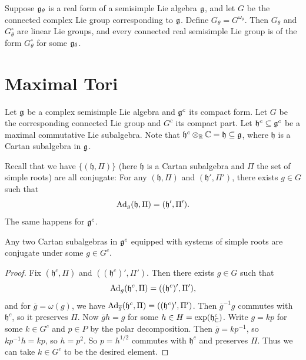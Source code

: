 \begin{prop}
  Suppose $\mathfrak{g}_\theta$ is a real form of a
  semisimple Lie algebra $\mathfrak{g}$, and let
  $G$ be the connected complex Lie group
  corresponding to $\mathfrak{g}$. Define
  $G_\theta = G^{\omega_\theta}$.
  Then $G_\theta$ and $G^\circ_\theta$ are
  linear Lie groups, and every connected
  real semisimple Lie group is of the form
  $G_\theta^\circ$ for some $\mathfrak{g}_\theta$.
\end{prop}

\section{Maximal Tori}

\begin{remark}
  Let $\mathfrak{g}$ be a complex semisimple Lie
  algebra and $\mathfrak{g}^c$ its compact form.
  Let $G$ be the corresponding connected
  Lie group and $G^c$ its compact part.
  Let $\mathfrak{h}^c \subseteq \mathfrak{g}^c$
  be a maximal commutative Lie subalgebra.
  Note that $\mathfrak{h}^c \otimes_{\mathbb{R}} \mathbb{C} = \mathfrak{h} \subseteq \mathfrak{g}$,
  where $\mathfrak{h}$ is
  a Cartan subalgebra in $\mathfrak{g}$.
\end{remark}

\begin{remark}
  Recall that we have
  $\{(\mathfrak{h}, \Pi)\}$ (here
  $\mathfrak{h}$ is a Cartan subalgebra
  and $\Pi$ the set of simple roots) are all
  conjugate: For any $(\mathfrak{h}, \Pi)$
  and $(\mathfrak{h}', \Pi')$, there
  exists $g \in G$ such that
  \[
    \operatorname{Ad}_g(\mathfrak{h}, \Pi) = (\mathfrak{h}', \Pi').
  \]
  The same happens for $\mathfrak{g}^c$.
\end{remark}

\begin{lemma}
  Any two Cartan subalgebras in $\mathfrak{g}^c$
  equipped with systems of simple roots
  are conjugate under some $g \in G^c$.
\end{lemma}

\begin{proof}
  Fix $(\mathfrak{h}^c, \Pi)$ and
  $((\mathfrak{h}^c)', \Pi')$. Then there
  exists $g \in G$ such that
  \[
    \operatorname{Ad}_g(\mathfrak{h}^c, \Pi) = ((\mathfrak{h}^c)', \Pi'),
  \]
  and for $\overline{g} = \omega(g)$,
  we have $\operatorname{Ad}_{\overline{g}}(\mathfrak{h}^c, \Pi) = ((\mathfrak{h}^c)', \Pi')$.
  Then $\overline{g}^{-1} g$ commutes
  with $\mathfrak{h}^c$,
  so it preserves $\Pi$. Now
  $\overline{g} h = g$ for some
  $h \in H = \exp(\mathfrak{h}^c_{\mathbb{C}})$.
  Write $g = kp$ for some $k \in G^c$ and
  $p \in P$ by the polar decomposition. Then
  $\overline{g} = kp^{-1}$, so
  $kp^{-1} h = kp$, so $h = p^2$.
  So $p = h^{1 / 2}$ commutes with
  $\mathfrak{h}^c$ and preserves
  $\Pi$. Thus we can take $k \in G^c$
  to be the desired element.
\end{proof}

